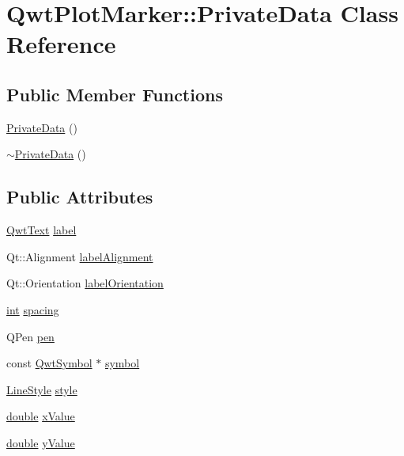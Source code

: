 \hypertarget{class_qwt_plot_marker_1_1_private_data}{\section{Qwt\-Plot\-Marker\-:\-:Private\-Data Class Reference}
\label{class_qwt_plot_marker_1_1_private_data}
}
\subsection*{Public Member Functions}
\begin{DoxyCompactItemize}
\item 
\hyperlink{class_qwt_plot_marker_1_1_private_data_ab2aec5d82312037d50fe3baacefa6d81}{Private\-Data} ()
\item 
\hyperlink{class_qwt_plot_marker_1_1_private_data_a8c32f48bc153d30276ddaef34d58186b}{$\sim$\-Private\-Data} ()
\end{DoxyCompactItemize}
\subsection*{Public Attributes}
\begin{DoxyCompactItemize}
\item 
\hyperlink{class_qwt_text}{Qwt\-Text} \hyperlink{class_qwt_plot_marker_1_1_private_data_a4a92617323c56acd7b3dab1fc41ffa88}{label}
\item 
Qt\-::\-Alignment \hyperlink{class_qwt_plot_marker_1_1_private_data_ae9af76b53cb9669ff3901691eb676ccb}{label\-Alignment}
\item 
Qt\-::\-Orientation \hyperlink{class_qwt_plot_marker_1_1_private_data_ad197cdd34ddfd60019f05f499ef91d32}{label\-Orientation}
\item 
\hyperlink{ioapi_8h_a787fa3cf048117ba7123753c1e74fcd6}{int} \hyperlink{class_qwt_plot_marker_1_1_private_data_ab25ef9fd02d38a7bdcf9f7b301a814e7}{spacing}
\item 
Q\-Pen \hyperlink{class_qwt_plot_marker_1_1_private_data_a23899b5a54b966f2e3bc38f4f187c68d}{pen}
\item 
const \hyperlink{class_qwt_symbol}{Qwt\-Symbol} $\ast$ \hyperlink{class_qwt_plot_marker_1_1_private_data_a6544954352ab80745ba5f7f275e9e60c}{symbol}
\item 
\hyperlink{class_qwt_plot_marker_a297efa835423bfa5a870bbc8ff1c623b}{Line\-Style} \hyperlink{class_qwt_plot_marker_1_1_private_data_a84a5f14c666828466760276ce0f0bc4a}{style}
\item 
\hyperlink{_super_l_u_support_8h_a8956b2b9f49bf918deed98379d159ca7}{double} \hyperlink{class_qwt_plot_marker_1_1_private_data_a377a13e7dcf76a7392a7312137502980}{x\-Value}
\item 
\hyperlink{_super_l_u_support_8h_a8956b2b9f49bf918deed98379d159ca7}{double} \hyperlink{class_qwt_plot_marker_1_1_private_data_adea55821900c61a18b11e424037d5213}{y\-Value}
\end{DoxyCompactItemize}


